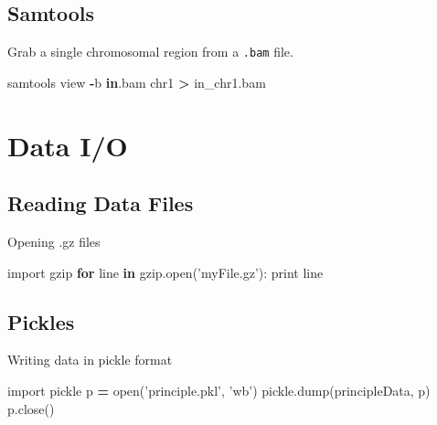 \documentclass[]{book}
\newenvironment{Shaded}{\begin{snugshade}}{\end{snugshade}}
\newcommand{\BuiltInTok}[1]{#1}
\newcommand{\ControlFlowTok}[1]{\textcolor[rgb]{0.13,0.29,0.53}{\textbf{#1}}}
\newcommand{\ImportTok}[1]{#1}
\newcommand{\KeywordTok}[1]{\textcolor[rgb]{0.13,0.29,0.53}{\textbf{#1}}}
\newcommand{\NormalTok}[1]{#1}
\newcommand{\OperatorTok}[1]{\textcolor[rgb]{0.81,0.36,0.00}{\textbf{#1}}}
\newcommand{\StringTok}[1]{\textcolor[rgb]{0.31,0.60,0.02}{#1}}
\begin{document}
\hypertarget{samtools}{%
\section{Samtools}\label{samtools}}

Grab a single chromosomal region from a \texttt{.bam} file.

\begin{Shaded}
\begin{Highlighting}[]
\NormalTok{samtools view }\OperatorTok{-}\NormalTok{b }\KeywordTok{in}\NormalTok{.bam chr1 }\OperatorTok{>}\NormalTok{ in_chr1.bam          }
\end{Highlighting}
\end{Shaded}

\hypertarget{io}{%
\chapter{Data I/O}\label{io}}

\hypertarget{reading-data-files}{%
\section{Reading Data Files}\label{reading-data-files}}

Opening .gz files

\begin{Shaded}
\begin{Highlighting}[]
\ImportTok{import}\NormalTok{ gzip}
\ControlFlowTok{for}\NormalTok{ line }\KeywordTok{in}\NormalTok{ gzip.}\BuiltInTok{open}\NormalTok{(}\StringTok{'myFile.gz'}\NormalTok{):}
    \BuiltInTok{print}\NormalTok{ line}
\end{Highlighting}
\end{Shaded}

\hypertarget{pickles}{%
\section{Pickles}\label{pickles}}

Writing data in pickle format

\begin{Shaded}
\begin{Highlighting}[]
\ImportTok{import}\NormalTok{ pickle}
\NormalTok{p }\OperatorTok{=} \BuiltInTok{open}\NormalTok{(}\StringTok{'principle.pkl'}\NormalTok{, }\StringTok{'wb'}\NormalTok{)}
\NormalTok{pickle.dump(principleData, p)}
\NormalTok{p.close()}
\end{Highlighting}
\end{Shaded}
\end{document}
